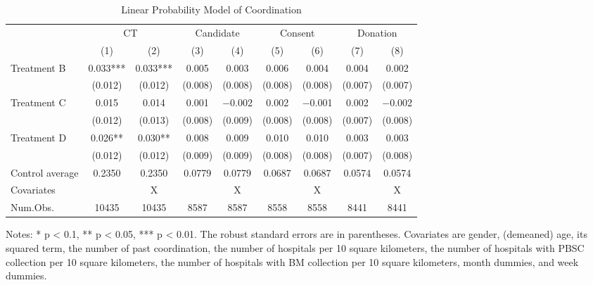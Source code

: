 \documentclass[12pt, a4paper]{article}
\begin{document}
\begin{table}

\caption{\label{tab:est-full-coordination}Linear Probability Model of Coordination}
\centering
\fontsize{9}{11}\selectfont
\begin{threeparttable}
\begin{tabular}[t]{lcccccccc}
\toprule
\multicolumn{1}{c}{ } & \multicolumn{2}{c}{CT} & \multicolumn{2}{c}{Candidate} & \multicolumn{2}{c}{Consent} & \multicolumn{2}{c}{Donation} \\
\cmidrule(l{3pt}r{3pt}){2-3} \cmidrule(l{3pt}r{3pt}){4-5} \cmidrule(l{3pt}r{3pt}){6-7} \cmidrule(l{3pt}r{3pt}){8-9}
  & (1) & (2) & (3) & (4) & (5) & (6) & (7) & (8)\\
\midrule
Treatment B & \num{0.033}*** & \num{0.033}*** & \num{0.005} & \num{0.003} & \num{0.006} & \num{0.004} & \num{0.004} & \num{0.002}\\
 & (\num{0.012}) & (\num{0.012}) & (\num{0.008}) & (\num{0.008}) & (\num{0.008}) & (\num{0.008}) & (\num{0.007}) & (\num{0.007})\\
Treatment C & \num{0.015} & \num{0.014} & \num{0.001} & \num{-0.002} & \num{0.002} & \num{-0.001} & \num{0.002} & \num{-0.002}\\
 & (\num{0.012}) & (\num{0.013}) & (\num{0.008}) & (\num{0.009}) & (\num{0.008}) & (\num{0.008}) & (\num{0.007}) & (\num{0.008})\\
Treatment D & \num{0.026}** & \num{0.030}** & \num{0.008} & \num{0.009} & \num{0.010} & \num{0.010} & \num{0.003} & \num{0.003}\\
 & (\num{0.012}) & (\num{0.012}) & (\num{0.009}) & (\num{0.009}) & (\num{0.008}) & (\num{0.008}) & (\num{0.007}) & (\num{0.008})\\
\midrule
Control average & 0.2350 & 0.2350 & 0.0779 & 0.0779 & 0.0687 & 0.0687 & 0.0574 & 0.0574\\
Covariates &  & X &  & X &  & X &  & X\\
Num.Obs. & \num{10435} & \num{10435} & \num{8587} & \num{8587} & \num{8558} & \num{8558} & \num{8441} & \num{8441}\\
\bottomrule
\end{tabular}
\begin{tablenotes}
\item Notes: * p < 0.1, ** p < 0.05, *** p < 0.01. The robust standard errors are in parentheses. Covariates are gender, (demeaned) age, its squared term, the number of past coordination, the number of hospitals per 10 square kilometers, the number of hospitals with PBSC collection per 10 square kilometers, the number of hospitals with BM collection per 10 square kilometers, month dummies, and week dummies.
\end{tablenotes}
\end{threeparttable}
\end{table}
\end{document}
